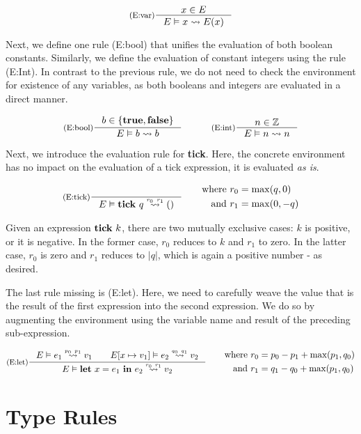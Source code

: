 \[
   \inference[(E:var)]
   {\contains{E}{x}}
   {\evals{E}{x}{E(x)}{}{}}
\]

Next, we define one rule (E:bool) that unifies the evaluation of both boolean constants. Similarly, we define the evaluation of constant integers using the rule (E:Int). In contrast to the previous rule, we do not need to check the environment for existence of any variables, as both booleans and integers are evaluated in a direct manner.

\[
   \inference[(E:bool)]{b \in \{\true, \false\}}{\evals{E}{b}{b}{}{}}%
   \quad\quad\quad
   \inference[(E:int)]{n \in \mathbb{Z}}{\evals{E}{n}{n}{}{}}
\]

Next, we introduce the evaluation rule for \textbf{tick}. Here, the concrete environment has no impact on the evaluation of a tick expression, it is evaluated \emph{as is}. 

\[
   \inference[(E:tick)]
   {}
   {\evals{E}{\tick{q}}{()}{r_0}{r_1}}%
   \qquad 
   \begin{aligned}
      \text{where }  &r_0 = \max(q, 0)\\
      \text{and }    &r_1 = \max(0, -q) 
   \end{aligned}
\]

Given an expression \(\mathbf{tick}~k\), there are two mutually exclusive cases: \(k\) is positive, or it is negative. In the former case, \(r_0\) reduces to \(k\) and \(r_1\) to zero. In the latter case, \(r_0\) is zero and \(r_1\) reduces to \(|q|\), which is again a positive number - as desired. 

The last rule missing is (E:let). Here, we need to carefully weave the value that is the result of the first expression into the second expression. We do so by augmenting the environment using the variable name and result of the preceding sub-expression.

\[
   \inference[(E:let)]
   {\evals{E}{e_1}{v_1}{p_0}{p_1} \qquad \evals{\envaugment{E}{x}{v_1}}{e_2}{v_2}{q_0}{q_1}}
   {\evals{E}{\letexp{x}{e_1}{e_2}}{v_2}{r_0}{r_1}}%
   \qquad
   \begin{aligned}
      \text{where }  &r_0 = p_0 - p_1 + \max(p_1, q_0)\\
      \text{and }    &r_1 = q_1 - q_0 + \max(p_1, q_0) 
   \end{aligned}
\]


\section{Type Rules}\label{sec:type-rules-5}

